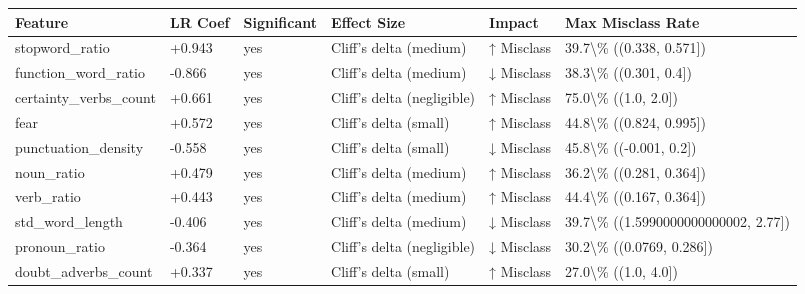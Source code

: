 \begin{tabular}{llllll}
\toprule
Feature & LR Coef & Significant & Effect Size & Impact & Max Misclass Rate \\
\midrule
stopword\_ratio & +0.943 & yes & Cliff's delta (medium) & ↑ Misclass & 39.7\textbackslash \% ((0.338, 0.571]) \\
function\_word\_ratio & -0.866 & yes & Cliff's delta (medium) & ↓ Misclass & 38.3\textbackslash \% ((0.301, 0.4]) \\
certainty\_verbs\_count & +0.661 & yes & Cliff's delta (negligible) & ↑ Misclass & 75.0\textbackslash \% ((1.0, 2.0]) \\
fear & +0.572 & yes & Cliff's delta (small) & ↑ Misclass & 44.8\textbackslash \% ((0.824, 0.995]) \\
punctuation\_density & -0.558 & yes & Cliff's delta (small) & ↓ Misclass & 45.8\textbackslash \% ((-0.001, 0.2]) \\
noun\_ratio & +0.479 & yes & Cliff's delta (medium) & ↑ Misclass & 36.2\textbackslash \% ((0.281, 0.364]) \\
verb\_ratio & +0.443 & yes & Cliff's delta (medium) & ↑ Misclass & 44.4\textbackslash \% ((0.167, 0.364]) \\
std\_word\_length & -0.406 & yes & Cliff's delta (medium) & ↓ Misclass & 39.7\textbackslash \% ((1.5990000000000002, 2.77]) \\
pronoun\_ratio & -0.364 & yes & Cliff's delta (negligible) & ↓ Misclass & 30.2\textbackslash \% ((0.0769, 0.286]) \\
doubt\_adverbs\_count & +0.337 & yes & Cliff's delta (small) & ↑ Misclass & 27.0\textbackslash \% ((1.0, 4.0]) \\
\bottomrule
\end{tabular}
